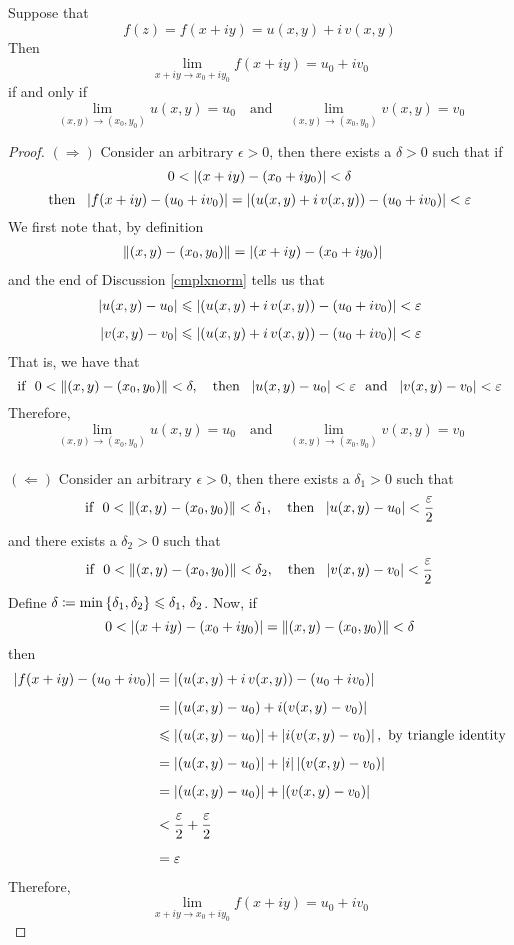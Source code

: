 \begin{theorem}\label{cmplxlimripart}
Suppose that
\[f(z) = f(x + iy) = u(x,y) + i\,v(x,y)\]
Then 
\[\lim_{x + iy \to x_0 + iy_0}f(x + iy) = u_0 + iv_0\]
if and only if
\[\lim_{(x,y) \to (x_0,y_0)}u(x,y) = u_0 \quad \text{and} \quad \lim_{(x,y) \to (x_0,y_0)}v(x,y) = v_0\]
\end{theorem}
\begin{proof}
$(\Rightarrow)$ Consider an arbitrary $\epsilon > 0$, then there exists a $\delta > 0$ such that if
\[0 < \left\lvert(x+iy) - (x_0 + iy_0)\right\rvert < \delta\]
\[\text{then }\ \abs{f(x+iy) - (u_0 + iv_0)} = \abs{(u(x,y) + i\,v(x,y)) - (u_0 + iv_0)} < \epsilon\]
We first note that, by definition
\begin{align*}
\left\lVert(x,y) - (x_0,y_0)\right\rVert &= \left\lvert(x+iy) - (x_0 + iy_0)\right\rvert
\end{align*}
and the end of Discussion \ref{cmplxnorm} tells us that
\begin{align*}
\left\lvert u(x,y) - u_0\right\rvert &\leqslant \left\lvert(u(x,y) + i\,v(x,y)) - (u_0 + iv_0)\right\rvert < \varepsilon\\[0.5em]
\left\lvert v(x,y) - v_0\right\rvert &\leqslant \left\lvert(u(x,y) + i\,v(x,y)) - (u_0 + iv_0)\right\rvert < \varepsilon
\end{align*}
That is, we have that
\[\text{if }\ 0 < \norm{(x,y) - (x_0,y_0)} < \delta,\quad \text{then }\ \abs{u(x,y) - u_0} < \epsilon\ \ \text{and}\ \ \abs{v(x,y) - v_0} < \epsilon\]
Therefore,
\[\lim_{(x,y) \to (x_0,y_0)}u(x,y) = u_0 \quad \text{and} \quad \lim_{(x,y) \to (x_0,y_0)}v(x,y) = v_0\]\\[1em]
$(\Leftarrow)$ Consider an arbitrary $\epsilon > 0$, then there exists a $\delta_1 > 0$ such that
\[\text{if }\ 0 < \left\lVert(x,y) - (x_0,y_0)\right\rVert < \delta_1,\quad \text{then }\ \left\lvert u(x,y) - u_0\right\rvert < \frac{\varepsilon}{2}\]
and there exists a $\delta_2 > 0$ such that
\[\text{if }\ 0 < \left\lVert(x,y) - (x_0,y_0)\right\rVert < \delta_2,\quad \text{then }\ \left\lvert v(x,y) - v_0\right\rvert < \frac{\varepsilon}{2}\]
Define $\delta \coloneqq \min\left\{\delta_1,\delta_2\right\} \leqslant \delta_1,\,\delta_2$. Now, if
\[0 < \left\lvert(x+iy) - (x_0 + iy_0)\right\rvert = \left\lVert(x,y) - (x_0,y_0)\right\rVert < \delta\]
then
\begin{align*}
\left\lvert f(x+iy) - (u_0 + iv_0)\right\rvert &= \left\lvert(u(x,y) + i\,v(x,y)) - (u_0 + iv_0)\right\rvert\\[0.5em]
&= \left\lvert(u(x,y) - u_0) + i(v(x,y)- v_0)\right\rvert\\[0.5em]
&\leqslant \left\lvert(u(x,y) - u_0)\right\rvert + \left\lvert i(v(x,y)- v_0)\right\rvert,\ \text{by triangle identity}\\[0.5em]
&= \left\lvert(u(x,y) - u_0)\right\rvert + \left\lvert i\right\rvert\left\lvert(v(x,y)- v_0)\right\rvert\\[0.5em]
&= \left\lvert(u(x,y) - u_0)\right\rvert + \left\lvert(v(x,y)- v_0)\right\rvert\\[0.5em]
&< \frac{\varepsilon}{2} + \frac{\varepsilon}{2}\\[0.5em]
&= \varepsilon
\end{align*}
Therefore,
\[\lim_{x + iy \to x_0 + iy_0}f(x + iy) = u_0 + iv_0\]
\end{proof}

